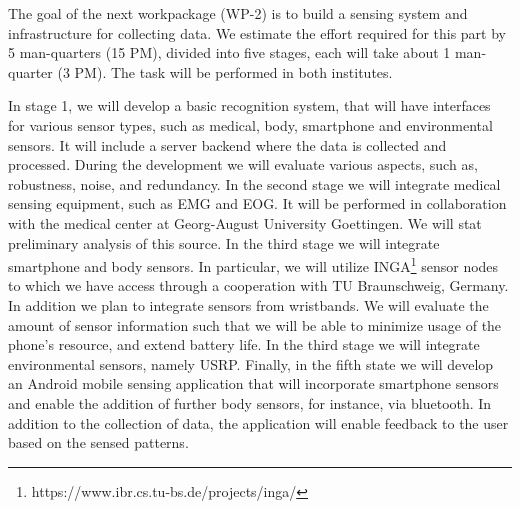 \documentclass[12pt]{article}
\begin{document}
The goal of the next workpackage (WP-2) is to build a sensing system and infrastructure for collecting data. We estimate the effort required for this part by 5 man-quarters (15 PM), divided into five stages, each will take about 1 man-quarter (3 PM). The task will be performed in both institutes. 

In stage 1, we will develop a basic recognition system, that will have interfaces for various sensor types, such as medical, body, smartphone and environmental sensors. It will include a server backend where the data is collected and processed. During the development we will evaluate various aspects, such as, robustness, noise, and redundancy.
In the second stage we will integrate medical sensing equipment, such as EMG and EOG. It will be performed in collaboration with the medical center at Georg-August University Goettingen. We will stat preliminary analysis of this source. In the third stage we will integrate smartphone and body sensors. 
In particular, we will utilize INGA\footnote{https://www.ibr.cs.tu-bs.de/projects/inga/} sensor nodes to which we have access through a cooperation with TU Braunschweig, Germany. 
In addition we plan to integrate sensors from wristbands. We will evaluate the amount of sensor information such that we will be able to minimize usage of the phone's resource, and extend battery life. In the third stage we will integrate environmental sensors, namely USRP. Finally, in the fifth state we will develop an Android mobile sensing application that will incorporate smartphone sensors and enable the addition of further body sensors, for instance, via bluetooth.
In addition to the collection of data, the application will enable feedback to the user based on the sensed patterns. 
 
\end{document}

